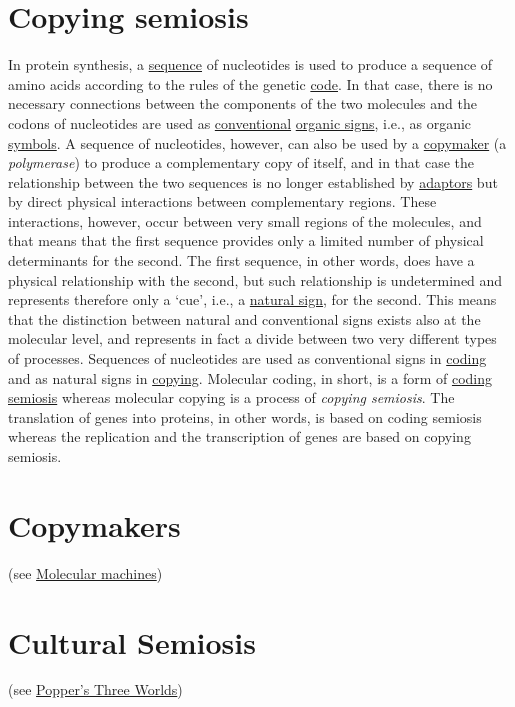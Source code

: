 \documentclass[12pt]{article}
\begin{document}
\section{Copying semiosis}
In protein synthesis, a \hyperlink{sequences}{sequence} of nucleotides is used to produce a sequence of amino acids according to the rules of the genetic \hyperlink{code}{code}. In that case, there is no necessary connections between the components of the two molecules and the codons of nucleotides are used as \hyperlink{natural_conventions}{conventional} \hyperlink{signs}{organic signs}, i.e., as organic \hyperlink{icons_indexes_and_symbols}{symbols}. A sequence of nucleotides, however, can also be used by a \hyperlink{copymakers}{copymaker} (a \textit{polymerase}) to produce a complementary copy of itself, and in that case the relationship between the two sequences is no longer established by \hyperlink{adaptor}{adaptors} but by direct physical interactions between complementary regions. These interactions, however, occur between very small regions of the molecules, and that means that the first sequence provides only a limited number of physical determinants for the second. The first sequence, in other words, does have a physical relationship with the second, but such relationship is undetermined and represents therefore only a `cue', i.e., a \hyperlink{natural_signs}{natural sign}, for the second. This means that the distinction between natural and conventional signs exists also at the molecular level, and represents in fact a divide between two very different types of processes. Sequences of nucleotides are used as conventional signs in \hyperlink{copying_and_coding}{coding} and as natural signs in \hyperlink{copying_and_coding}{copying}. Molecular coding, in short, is a form of \hyperlink{coding_semiosis}{coding semiosis} whereas molecular copying is a process of \textit{copying semiosis}. The translation of genes into proteins, in other words, is based on coding semiosis whereas the replication and the transcription of genes are based on copying semiosis.


\hypertarget{copymakers}{}
\section{Copymakers} (see \hyperlink{molecular_machines}{Molecular machines}) 
 

\hypertarget{cultural_semiosis}{}
\section{Cultural Semiosis} (see \hyperlink{poppers_three_worlds}{Popper's Three Worlds})
\end{document}
